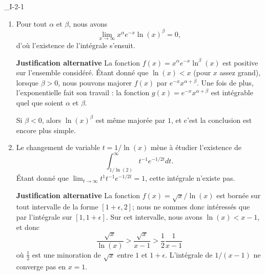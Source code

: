 \begin{corrige}{_I-2-1}
\begin{enumerate}
{\bf Justification alternative} Sans perte de généralité, nous pouvons supposer que $P(x)$ est positif. En effet, pour $x$ assez grand, un polynôme ne change plus de signe, et nous pouvons éventuellement considérer $-P(x)$ au lieu de $P(x)$. Soit $Q$, un polynôme de degré deux plus haut que $P$, que nous prenons positif. Une propriété de l'exponentielle est que $\exists x_0>0$ tel que $x>x_0$ implique $ e^{-x^2}>Q(x)$ et $Q(x)>P(x)$, et donc
\begin{equation}
	\frac{ P(x) }{ Q(x) }>P(x) e^{-x^2}
\end{equation}
pour $x>x_0$. Mais, la fraction rationnelle $P/Q$ est intégrable sur $[x_0,\infty[$ parce qu'elle peut être majoré par une fonction de la forme $a/x^2$, comme dans l'exercice \ref{ExoPointPremierIdeuxUn}. Le théorème \ref{ThoFnTestIntnnBorn} conclut à l'intégrabilité de $f$ sur $[0,\infty[$.

\item

Pour tout $\alpha$ et $\beta$, nous avons
\begin{equation}
	\lim_{x\to\infty}x^{\alpha} e^{-x}\ln(x)^{\beta}=0,
\end{equation}
d'où l'existence de l'intégrale s'ensuit.

{\bf Justification alternative}
 La fonction $f(x)=x^{\alpha} e^{-x}\ln^{\beta}(x)$ est positive sur l'ensemble considéré. Étant donné que $\ln(x)<x$ (pour $x$ assez grand), lorsque $\beta>0$, nous pouvons majorer $f(x)$ par $ e^{-x}x^{\alpha+\beta}$. Une fois de plus, l'exponentielle fait son travail : la fonction $g(x)= e^{-x}x^{\alpha+\beta}$ est intégrable quel que soient $\alpha$ et $\beta$.

Si $\beta<0$, alors $\ln(x)^{\beta}$ est même majorée par $1$, et c'est la conclusion est encore plus simple.

\item\label{ItemDCorrI21}

Le changement de variable $t=1/\ln(x)$ mène à étudier l'existence de
\begin{equation}
	\int_{1/\ln(2)}^{\infty}t^{-1} e^{-1/2t}dt.
\end{equation}
Étant donné que $\lim_{t\to \infty}t^1t^{-1} e^{-1/2t}=1$, cette intégrale n'existe pas.

{\bf Justification alternative}
 La fonction $f(x)=\sqrt{x}/\ln(x)$ est bornée sur tout intervalle de la forme $[1+\epsilon,2]$; nous ne sommes donc intéressés que par l'intégrale sur $[1,1+\epsilon]$. Sur cet intervalle, nous avons $\ln(x)<x-1$, et donc 
\begin{equation}
	\frac{ \sqrt{x} }{ \ln(x) }>\frac{ \sqrt{x} }{ x-1 }>\frac{ 1 }{ 2 }\frac{ 1 }{ x-1 }
\end{equation}
où $\frac{ 1 }{2}$ est une minoration de $\sqrt{x}$ entre $1$ et $1+\epsilon$. L'intégrale de $1/(x-1)$ ne converge pas en $x=1$.


\end{enumerate}
\end{corrige}
